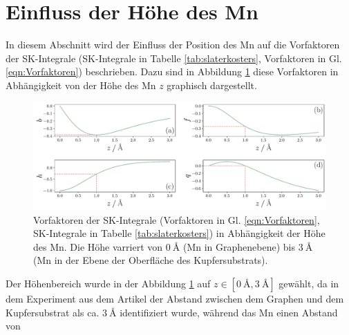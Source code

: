 \section{Einfluss der Höhe des Mn}
In diesem Abschnitt wird der Einfluss der Position des Mn auf die Vorfaktoren der SK-Integrale (SK-Integrale in Tabelle \ref{tab:slaterkosters}, Vorfaktoren in Gl. \eqref{eqn:Vorfaktoren}) beschrieben.
Dazu sind in Abbildung \ref{fig:Faktoreninz} diese Vorfaktoren in Abhängigkeit von der Höhe des Mn $z$ graphisch dargestellt.
\begin{figure}
    \centering
    \includegraphics[width = \textwidth]{Plots/Faktoreninz.pdf}
    \caption{Vorfaktoren der SK-Integrale (Vorfaktoren in Gl. \eqref{eqn:Vorfaktoren}, SK-Integrale in Tabelle \ref{tab:slaterkosters}) in Abhängigkeit der Höhe des Mn.
    Die Höhe varriert von $\qty{0}{\angstrom}$ (Mn in Graphenebene) bis $\qty{3}{\angstrom}$ (Mn in der Ebene der Oberfläche des Kupfersubstrats).}
    \label{fig:Faktoreninz}
\end{figure}
Der Höhenbereich wurde in der Abbildung \ref{fig:Faktoreninz} auf $z \in [\qty{0}{\angstrom}, \qty{3}{\angstrom}]$ gewählt, da in dem Experiment aus dem Artikel \cite{doi:10.1021/acsnano.1c00139} 
der Abstand zwischen dem Graphen und dem Kupfersubstrat als ca. $\qty{3}{\angstrom}$ identifiziert wurde, während das Mn einen Abstand von 
